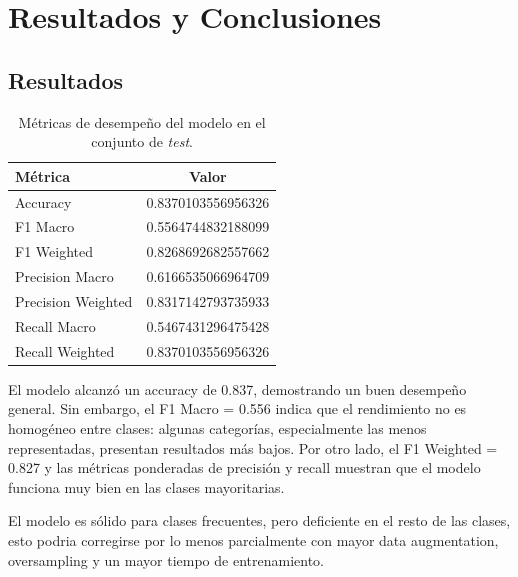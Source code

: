 
\chapter{Resultados y Conclusiones} %



\section{Resultados}

\begin{table}[H]
    \centering
    \caption{Métricas de desempeño del modelo en el conjunto de \textit{test}.}
    \label{tab:test_metrics}
    \begin{tabular}{l c}
        \toprule
        \textbf{Métrica} & \textbf{Valor} \\
        \midrule
        Accuracy                & 0.8370103556956326 \\
        F1 Macro                & 0.5564744832188099 \\
        F1 Weighted             & 0.8268692682557662 \\
        Precision Macro         & 0.6166535066964709 \\
        Precision Weighted      & 0.8317142793735933 \\
        Recall Macro            & 0.5467431296475428 \\
        Recall Weighted         & 0.8370103556956326 \\
        \bottomrule
    \end{tabular}
\end{table}

El modelo alcanzó un accuracy de 0.837, demostrando un buen desempeño general. Sin embargo, el F1 Macro = 0.556 indica que el rendimiento no es homogéneo entre clases: algunas categorías, especialmente las menos representadas, presentan resultados más bajos. Por otro lado, el F1 Weighted = 0.827 y las métricas ponderadas de precisión y recall muestran que el modelo funciona muy bien en las clases mayoritarias.

El modelo es sólido para clases frecuentes, pero deficiente en el resto de las clases, esto podria corregirse por lo menos parcialmente con mayor data augmentation, oversampling y un mayor tiempo de entrenamiento.

